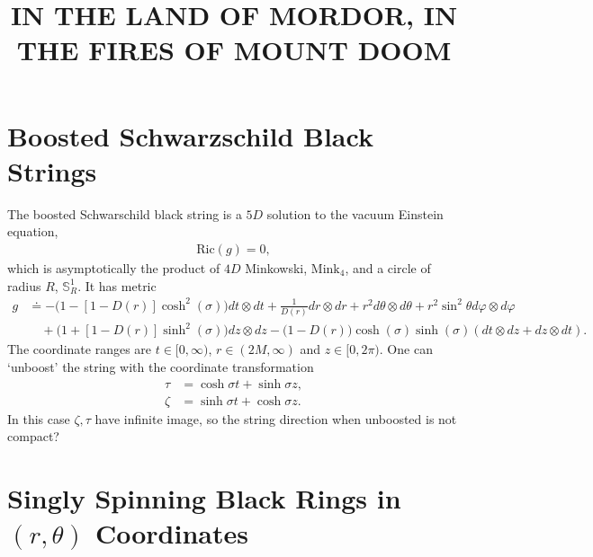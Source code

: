 \documentclass[11pt]{article}
\title{	\normalsize \textsc{} 	%
		 		\LARGE \textbf{\uppercase{In The Land of Mordor, In The Fires of Mount Doom}}	%
		}
\date{}
\renewcommand{\phi}{\varphi}
\begin{document}
 \maketitle
 \section{Boosted Schwarzschild Black Strings}
 The boosted Schwarschild black string is a $5D$ solution to the vacuum Einstein equation, 
 \begin{align}
 \mathrm{Ric}(g)=0,
 \end{align}
 which is asymptotically the product of $4D$ Minkowski, $\mathrm{Mink}_4$, and a circle of radius $R$, $\mathbb{S}^1_{R}$. It has metric
 \begin{align}
 g&\doteq-\big(1-[1-D(r)]\cosh^2(\sigma)\big)dt\otimes dt+\frac{1}{D(r)}dr\otimes dr+r^2d\theta\otimes d\theta+r^2\sin^2\theta d\phi\otimes d\phi\\
 &\nonumber\quad+\big(1+[1-D(r)]\sinh^2(\sigma)\big)dz\otimes dz-\big(1-D(r)\big)\cosh(\sigma)\sinh(\sigma)(dt\otimes dz+dz\otimes dt).
 \end{align}
 The coordinate ranges are $t\in[0,\infty)$, $r\in (2M,\infty)$ and $z\in [0,2\pi)$. One can `unboost' the string with the coordinate transformation
 \begin{align}
 \tau&=\cosh\sigma t+\sinh\sigma z,\\
 \zeta&=\sinh\sigma t+\cosh\sigma z.
 \end{align}
 In this case $\zeta,\tau $ have infinite image, so the string direction when unboosted is not compact?
\section{Singly Spinning Black Rings in $(r,\theta)$ Coordinates}
\end{document}
